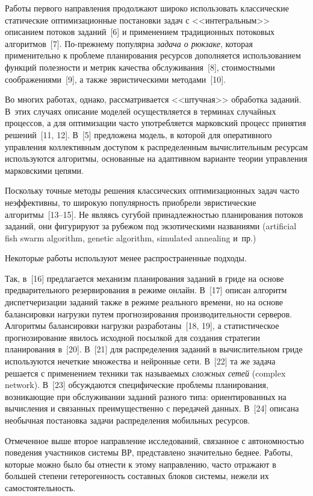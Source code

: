 \begin{multicols}{2}
  Работы первого направления продолжают широко использовать классические статические 
оптимизационные постановки задач с <<интегральным>> описанием потоков заданий~[6] и 
применением традиционных потоковых алгоритмов~[7]. По-преж\-нему популярна 
\textit{задача о рюкзаке}, которая применительно к проблеме планирования ресурсов 
дополня\-ется использованием функций полезности и метрик качества обслуживания~[8], 
стоимостными соображениями~[9], а также эвристическими методами~[10]. 

Во многих работах, 
однако, рассматривается <<штучная>> обработка заданий. В~этих случаях описание 
моделей осуществляется в терминах случайных процессов, а для оптимизации часто 
употребляется марковский процесс принятия решений~[11, 12]. В~[5] предложена модель, в 
которой для оперативного управления коллективным доступом к распределенным 
вычислительным ресурсам используются алгоритмы, основанные на адаптивном варианте 
теории управления марковскими цепями.
  
  Поскольку точные методы решения классических оптимизационных задач часто 
неэффективны, то широкую популярность приобрели эвристические алгоритмы~[13--15]. Не 
являясь сугубой принадлежностью планирования потоков заданий, они фигурируют за 
рубежом под экзотическими названиями (artificial fish swarm algorithm, genetic algorithm, 
simulated annealing и~пр.)
  
  Некоторые работы используют менее распространенные подходы. 
  
  Так, в~[16] 
предлагается механизм планирования заданий в гриде на основе предварительного 
резервирования в режиме онлайн. В~[17] описан алгоритм диспетчеризации заданий также в 
режиме реального времени, но на основе балансировки нагрузки путем прогнозирования 
производительности серверов. Алгоритмы балансировки нагрузки разработаны~[18, 19], а 
статистическое прогнозирование явилось исходной посылкой для создания стратегии 
планирования в~[20]. В~[21] для распределения заданий в вычислительном гриде 
используются нечеткие множества и нейронные сети. В~[22] та же задача решается с 
применением техники так называемых \textit{сложных сетей} (complex network). В~[23] 
обсуждаются специфические проблемы планирования, возникающие при обслуживании 
заданий разного типа: ориентированных на вычисления и связанных преимущественно с 
передачей данных. В~[24] описана необычная постановка задачи распределения мобильных 
ресурсов.
\columnbreak
  
  Отмеченное выше второе направление исследований, связанное с автономностью 
поведения участников системы ВР, представлено значительно беднее. Работы, которые 
можно было бы отнести к этому направлению, часто отражают в большей степени 
гетерогенность составных блоков системы, нежели их самостоятельность.
  

\end{multicols}

